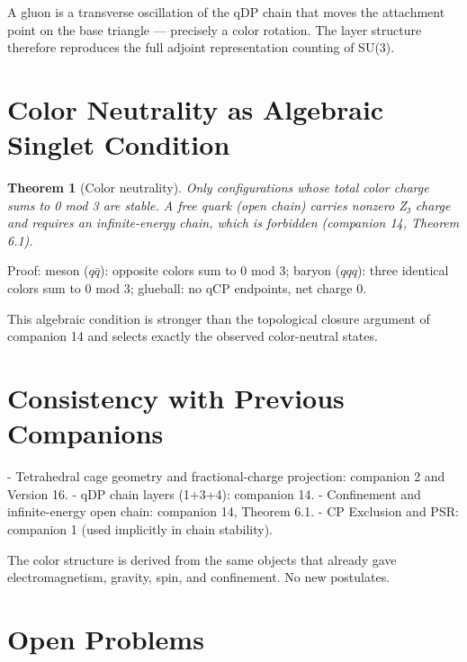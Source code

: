\documentclass[12pt]{article}
\newtheorem{theorem}{Theorem}[section]
\begin{document}
A gluon is a transverse oscillation of the qDP chain that moves the attachment point on the base triangle — precisely a color rotation. The layer structure therefore reproduces the full adjoint representation counting of SU(3).

\section{Color Neutrality as Algebraic Singlet Condition}

\begin{theorem}[Color neutrality]
Only configurations whose total color charge sums to 0 mod 3 are stable. A free quark (open chain) carries nonzero Z₃ charge and requires an infinite-energy chain, which is forbidden (companion 14, Theorem 6.1).
\end{theorem}

Proof: meson (\(q\bar{q}\)): opposite colors sum to 0 mod 3; baryon (\(qqq\)): three identical colors sum to 0 mod 3; glueball: no qCP endpoints, net charge 0.

This algebraic condition is stronger than the topological closure argument of companion 14 and selects exactly the observed color-neutral states.

\section{Consistency with Previous Companions}

- Tetrahedral cage geometry and fractional-charge projection: companion 2 and Version 16.
- qDP chain layers (1+3+4): companion 14.
- Confinement and infinite-energy open chain: companion 14, Theorem 6.1.
- CP Exclusion and PSR: companion 1 (used implicitly in chain stability).

The color structure is derived from the same objects that already gave electromagnetism, gravity, spin, and confinement. No new postulates.

\section{Open Problems}
\end{document}
